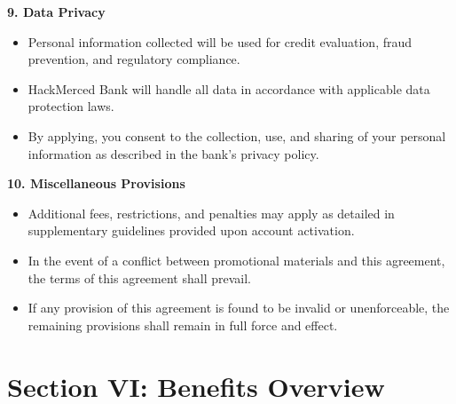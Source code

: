 \documentclass[12pt,a4paper]{article}
\begin{document}
\begin{spacing}{1.1}
\vspace{1em}
\textbf{9. Data Privacy}\\[1ex]
\begin{itemize}
    \item Personal information collected will be used for credit evaluation, fraud prevention, and regulatory compliance.
    \item HackMerced Bank will handle all data in accordance with applicable data protection laws.
    \item By applying, you consent to the collection, use, and sharing of your personal information as described in the bank’s privacy policy.
\end{itemize}

\vspace{1em}
\textbf{10. Miscellaneous Provisions}\\[1ex]
\begin{itemize}
    \item Additional fees, restrictions, and penalties may apply as detailed in supplementary guidelines provided upon account activation.
    \item In the event of a conflict between promotional materials and this agreement, the terms of this agreement shall prevail.
    \item If any provision of this agreement is found to be invalid or unenforceable, the remaining provisions shall remain in full force and effect.
\end{itemize}
\end{spacing}

\newpage

\section*{Section VI: Benefits Overview}
\end{document}
